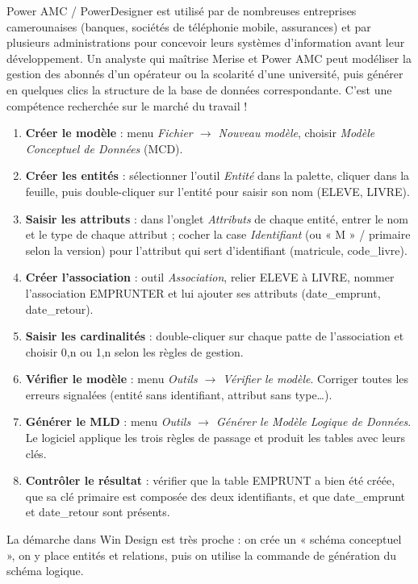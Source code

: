 \documentclass[11pt]{article}
\begin{document}
\begin{savaistu}
Power AMC / PowerDesigner est utilisé par de nombreuses entreprises camerounaises (banques, sociétés de téléphonie mobile, assurances) et par plusieurs administrations pour concevoir leurs systèmes d'information avant leur développement. Un analyste qui maîtrise Merise et Power AMC peut modéliser la gestion des abonnés d'un opérateur ou la scolarité d'une université, puis générer en quelques clics la structure de la base de données correspondante. C'est une compétence recherchée sur le marché du travail !
\end{savaistu}

\begin{methode}
\begin{enumerate}
\item \textbf{Créer le modèle} : menu \emph{Fichier $\rightarrow$ Nouveau modèle}, choisir \emph{Modèle Conceptuel de Données} (MCD).
\item \textbf{Créer les entités} : sélectionner l'outil \emph{Entité} dans la palette, cliquer dans la feuille, puis double-cliquer sur l'entité pour saisir son nom (ELEVE, LIVRE).
\item \textbf{Saisir les attributs} : dans l'onglet \emph{Attributs} de chaque entité, entrer le nom et le type de chaque attribut ; cocher la case \emph{Identifiant} (ou « M » / primaire selon la version) pour l'attribut qui sert d'identifiant (matricule, code\_livre).
\item \textbf{Créer l'association} : outil \emph{Association}, relier ELEVE à LIVRE, nommer l'association EMPRUNTER et lui ajouter ses attributs (date\_emprunt, date\_retour).
\item \textbf{Saisir les cardinalités} : double-cliquer sur chaque patte de l'association et choisir 0,n ou 1,n selon les règles de gestion.
\item \textbf{Vérifier le modèle} : menu \emph{Outils $\rightarrow$ Vérifier le modèle}. Corriger toutes les erreurs signalées (entité sans identifiant, attribut sans type\ldots).
\item \textbf{Générer le MLD} : menu \emph{Outils $\rightarrow$ Générer le Modèle Logique de Données}. Le logiciel applique les trois règles de passage et produit les tables avec leurs clés.
\item \textbf{Contrôler le résultat} : vérifier que la table EMPRUNT a bien été créée, que sa clé primaire est composée des deux identifiants, et que date\_emprunt et date\_retour sont présents.
\end{enumerate}
La démarche dans Win Design est très proche : on crée un « schéma conceptuel », on y place entités et relations, puis on utilise la commande de génération du schéma logique.
\end{methode}
\end{document}

